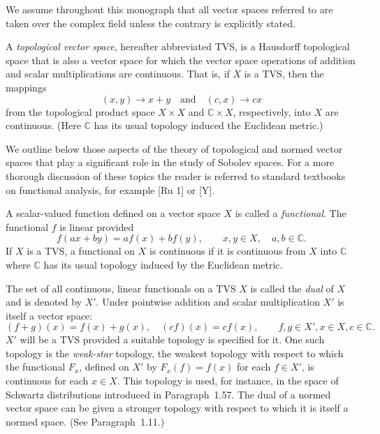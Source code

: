 \begin{para}
  We assume throughout this monograph that all vector spaces referred to are
  taken over the complex field unless the contrary is explicitly stated.

  A \emph{topological vector space}, hereafter abbreviated TVS,
  is a Hausdorff topological space that is also a vector space for
  which the vector space operations of addition and scalar multiplications
  are continuous. That is, if $X$ is a TVS, then the mappings
  \[(x,y)\to x+y\quad\text{and}\quad (c,x)\to cx\]
  from the topological product space $X\times X$ and $\mathbb{C}\times X$,
  respectively, into $X$ are continuous.
  (Here $\mathbb{C}$ has its usual topology induced the Euclidean metric.)

  We outline below those aspects of the theory of topological and 
  normed vector spaces that play a significant role in the study of Sobolev spaces.
  For a more thorough discussion of these topics the reader is referred to
  standard textbooks on functional analysis, for example [Ru 1] or [Y].
\end{para}

\begin{para}[Functionals]
  A scalar-valued function defined on a vector space $X$ is called a \emph{functional}.
  The functional $f$ is linear provided
  \[f(ax+by) = af(x) + bf(y),\qquad x,y\in X,\quad a,b\in\mathbb{C}.\]
  If $X$ is a TVS, a functional on $X$ is continuous if it is continuous
  from $X$ into $\mathbb{C}$ where $\mathbb{C}$ has its usual topology 
  induced by the Euclidean metric.

  The set of all continuous, linear functionals on a TVS $X$ is called 
  the \emph{dual} of $X$ and is denoted by $X'$. Under pointwise addition and scalar 
  multiplication $X'$ is itself a vector space:
  \[(f+g)(x) = f(x)+g(x),\quad
    (cf)(x) = cf(x),\qquad f,g\in X', x\in X, c\in \mathbb{C}.\]
  $X'$ will be a TVS provided a suitable topology is specified for it. 
  One such topology is the \emph{weak-star} topology, 
  the weakest topology with respect to which the functional $F_x$, 
  defined on $X'$ by $F_x(f) = f(x)$ for each $f\in X'$, is continuous for each $x\in X$.
  This topology is used, for instance, in the space of Schwartz distributions 
  introduced in Paragraph~1.57. The dual of a normed vector space can be given a stronger 
  topology with respect to which it is itself a normed space. (See Paragraph~1.11.)
\end{para}


